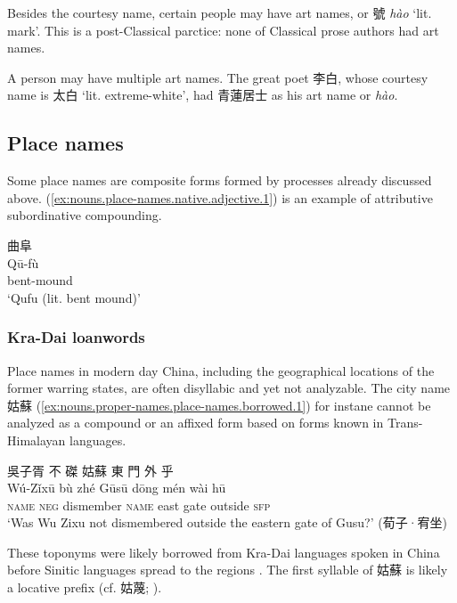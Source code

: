 \documentclass[UTF8, a4paper, oneside, scheme=plain, 12pt]{ctexrep}
\newcommand{\form}[1]{\emph{#1}}
\newcommand{\translate}[1]{`#1'}
\newcommand*{\category}[1]{\textsc{#1}}
\begin{document}
Besides the courtesy name, certain people may have art names,
or 號 \form{hào} \translate{lit. mark}.
This is a post-Classical parctice:
none of Classical prose authors had art names.

A person may have multiple art names.
The great poet 李白, whose courtesy name is 太白 \translate{lit. extreme-white},
had 青蓮居士 as his art name or \form{hào}.

\subsection{Place names}

Some place names are composite forms formed by processes already discussed above.
(\ref{ex:nouns.place-names.native.adjective.1}) is an example of attributive subordinative compounding.

\begin{exe}
    \ex\label{ex:nouns.place-names.native.adjective.1}
    \glll 曲阜 \\
    Qū-fù \\
    bent-mound \\
    \glt\translate{Qufu (lit. bent mound)}
\end{exe}

\subsubsection{Kra-Dai loanwords}\label{sec:nouns.proper-names.place-names.kra-dai}

Place names in modern day China, including the geographical locations of the former warring states,
are often disyllabic and yet not analyzable.
The city name 姑蘇 (\ref{ex:nouns.proper-names.place-names.borrowed.1})
for instane cannot be analyzed as a compound or an affixed form
based on forms known in Trans-Himalayan languages.

\begin{exe}
    \ex\label{ex:nouns.proper-names.place-names.borrowed.1}
    \glll 吳子胥 不 磔 姑蘇 東 門 外 乎 \\
    Wú-Zǐxū bù zhé Gūsū dōng mén wài hū \\
    \category{name} \category{neg} dismember \category{name} east gate outside \category{sfp} \\
    \glt\translate{Was Wu Zixu not dismembered outside the eastern gate of Gusu?} \hfill (荀子·宥坐)
\end{exe}

These toponyms were likely borrowed from Kra-Dai languages spoken in China 
before Sinitic languages spread to the regions \citep{zhengzhang1990kradai,zhengzhang1996kradai}.
The first syllable of 姑蘇 is likely a locative prefix
(cf. 姑蔑; \citealt{zhengzhang1996kradai}).
\end{document}
